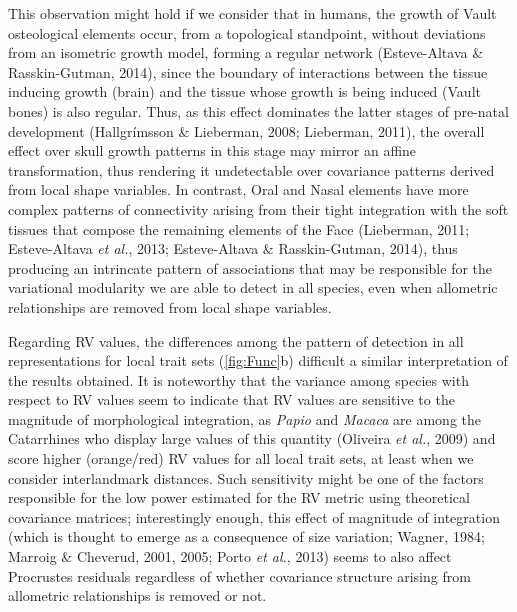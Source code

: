 \documentclass[12pt,twoside]{report}
\begin{document}
This observation might hold if we consider that in humans, the growth of
Vault osteological elements occur, from a topological standpoint,
without deviations from an isometric growth model, forming a regular
network (Esteve-Altava \& Rasskin-Gutman, 2014), since the boundary of
interactions between the tissue inducing growth (brain) and the tissue
whose growth is being induced (Vault bones) is also regular. Thus, as
this effect dominates the latter stages of pre-natal development
(Hallgrímsson \& Lieberman, 2008; Lieberman, 2011), the overall effect
over skull growth patterns in this stage may mirror an affine
transformation, thus rendering it undetectable over covariance patterns
derived from local shape variables. In contrast, Oral and Nasal elements
have more complex patterns of connectivity arising from their tight
integration with the soft tissues that compose the remaining elements of
the Face (Lieberman, 2011; Esteve-Altava \emph{et al.}, 2013;
Esteve-Altava \& Rasskin-Gutman, 2014), thus producing an intrincate
pattern of associations that may be responsible for the variational
modularity we are able to detect in all species, even when allometric
relationships are removed from local shape variables.

Regarding RV values, the differences among the pattern of detection in
all representations for local trait sets (\autoref{fig:Func}b) difficult
a similar interpretation of the results obtained. It is noteworthy that
the variance among species with respect to RV values seem to indicate
that RV values are sensitive to the magnitude of morphological
integration, as \emph{Papio} and \emph{Macaca} are among the Catarrhines
who display large values of this quantity (Oliveira \emph{et al.}, 2009)
and score higher (orange/red) RV values for all local trait sets, at
least when we consider interlandmark distances. Such sensitivity might
be one of the factors responsible for the low power estimated for the RV
metric using theoretical covariance matrices; interestingly enough, this
effect of magnitude of integration (which is thought to emerge as a
consequence of size variation; Wagner, 1984; Marroig \& Cheverud, 2001,
2005; Porto \emph{et al.}, 2013) seems to also affect Procrustes
residuals regardless of whether covariance structure arising from
allometric relationships is removed or not.
\end{document}
